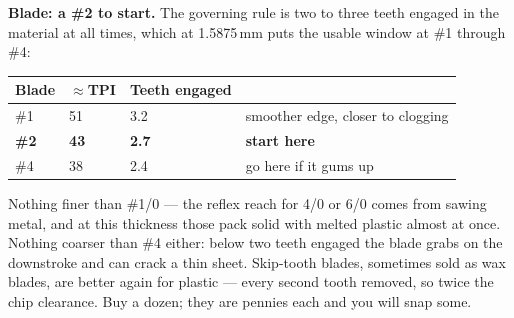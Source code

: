 \documentclass[letterpaper,11pt]{article}
\begin{document}
\textbf{Blade: a \#2 to start.} The governing rule is two to three teeth engaged in the
material at all times, which at 1.5875\,mm puts the usable window at \#1 through \#4:

\begin{center}
\begin{tabular}{@{}llll@{}}
\toprule
\textbf{Blade} & \textbf{$\approx$TPI} & \textbf{Teeth engaged} & \\
\midrule
\#1 & 51 & 3.2 & smoother edge, closer to clogging \\
\textbf{\#2} & \textbf{43} & \textbf{2.7} & \textbf{start here} \\
\#4 & 38 & 2.4 & go here if it gums up \\
\bottomrule
\end{tabular}
\end{center}

Nothing finer than \#1/0 --- the reflex reach for 4/0 or 6/0 comes from sawing metal, and at
this thickness those pack solid with melted plastic almost at once. Nothing coarser than
\#4 either: below two teeth engaged the blade grabs on the downstroke and can crack a thin
sheet. Skip-tooth blades, sometimes sold as wax blades, are better again for plastic --- every
second tooth removed, so twice the chip clearance. Buy a dozen; they are pennies each and you
will snap some.
\end{document}
